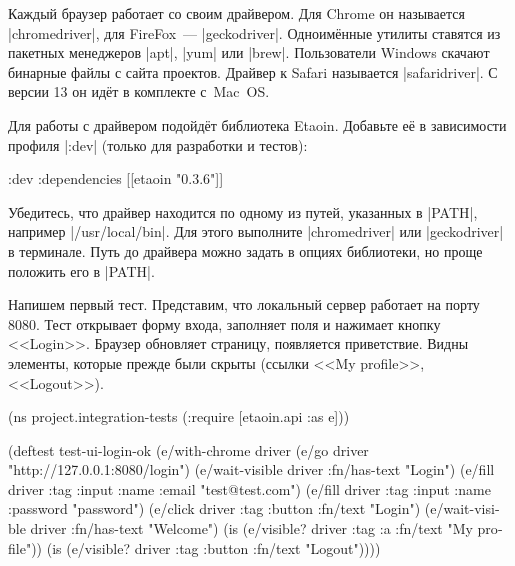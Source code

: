 Каждый браузер работает со своим драйвером. Для Chrome он называется
\spverb|chromedriver|, для FireFox~--- \spverb|geckodriver|. Одноимённые утилиты
ставятся из пакетных менеджеров \spverb|apt|, \spverb|yum| или
\spverb|brew|. Пользователи Windows скачают бинарные файлы с сайта
проектов. Драйвер к Safari называется \spverb|safaridriver|. С версии 13 он
идёт в комплекте с~Mac~OS.


Для работы с драйвером подойдёт библиотека Etaoin.
Добавьте её в зависимости профиля \spverb|:dev| (только для разработки и тестов):

\begin{english}
  \begin{clojure}
:dev {:dependencies [[etaoin "0.3.6"]]}
  \end{clojure}
\end{english}

Убедитесь, что драйвер находится по одному из путей, указанных в \spverb|PATH|,
например \spverb|/usr/local/bin|. Для этого выполните \spverb|chromedriver| или
\spverb|geckodriver| в терминале. Путь до драйвера можно задать в опциях
библиотеки, но проще положить его в \spverb|PATH|.


Напишем первый тест. Представим, что локальный сервер работает на порту
8080. Тест открывает форму входа, заполняет поля и нажимает кнопку
<<Login>>. Браузер обновляет страницу, появляется приветствие. Видны элементы,
которые прежде были скрыты (ссылки <<My profile>>, <<Logout>>).

\begin{english}
  \begin{clojure}
(ns project.integration-tests
  (:require [etaoin.api :as e]))

(deftest test-ui-login-ok
  (e/with-chrome {} driver
    (e/go driver "http://127.0.0.1:8080/login")
    (e/wait-visible driver {:fn/has-text "Login"})
    (e/fill driver {:tag :input :name :email} "test@test.com")
    (e/fill driver {:tag :input :name :password} "password")
    (e/click driver {:tag :button :fn/text "Login"})
    (e/wait-visible driver {:fn/has-text "Welcome"})
    (is (e/visible? driver {:tag :a :fn/text "My profile"}))
    (is (e/visible? driver {:tag :button :fn/text "Logout"}))))
  \end{clojure}
\end{english}

